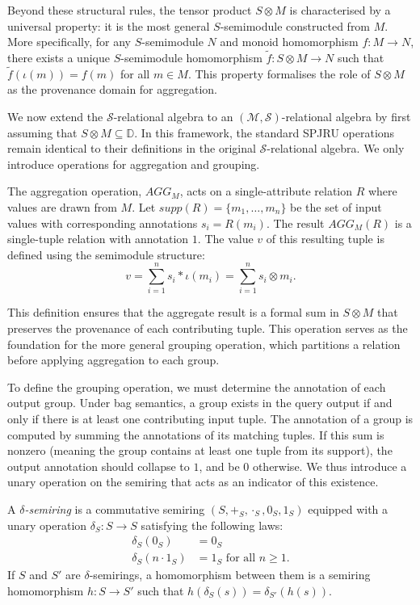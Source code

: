 \documentclass[oneside, 11pt]{amsbook}
\theoremstyle{plain}
\theoremstyle{definition}
\theoremstyle{remark}
\begin{document}
Beyond these structural rules, the tensor product $S \otimes M$ is characterised by a universal property: it is the most general $S$-semimodule constructed from $M$. More specifically, for any $S$-semimodule $N$ and monoid homomorphism $f: M \to N$, there exists a unique $S$-semimodule homomorphism $\tilde{f}: S \otimes M \to N$ such that $\tilde{f}(\iota(m)) = f(m)$ for all $m \in M$. This property formalises the role of $S \otimes M$ as the provenance domain for aggregation.

We now extend the $\mathcal{S}$-relational algebra to an $(\mathcal{M}, \mathcal{S})$-relational algebra by first assuming that $S \otimes M \subseteq \mathbb{D}$. In this framework, the standard SPJRU operations remain identical to their definitions in the original $\mathcal{S}$-relational algebra. We only introduce operations for aggregation and grouping.

\begin{defn}[Aggregation]
    The aggregation operation, $AGG_M$, acts on a single-attribute relation $R$ where values are drawn from $M$. Let $supp(R) = \{m_1, \dots, m_n\}$ be the set of input values with corresponding annotations $s_i = R(m_i)$. The result $AGG_M(R)$ is a single-tuple relation with annotation $1$. The value $v$ of this resulting tuple is defined using the semimodule structure:
    \[
        v = \sum_{i=1}^n s_i \ast \iota(m_i) = \sum_{i=1}^n s_i \otimes m_i.
    \]
\end{defn}

This definition ensures that the aggregate result is a formal sum in $S \otimes M$ that preserves the provenance of each contributing tuple. This operation serves as the foundation for the more general grouping operation, which partitions a relation before applying aggregation to each group.

To define the grouping operation, we must determine the annotation of each output group. Under bag semantics, a group exists in the query output if and only if there is at least one contributing input tuple. The annotation of a group is computed by summing the annotations of its matching tuples. If this sum is nonzero (meaning the group contains at least one tuple from its support), the output annotation should collapse to $1$, and be $0$ otherwise. We thus introduce a unary operation on the semiring that acts as an indicator of this existence.

\begin{defn}
    A \emph{$\delta$-semiring} is a commutative semiring $(S, +_S, \cdot_S, 0_S, 1_S)$ equipped with a unary operation $\delta_S : S \to S$ satisfying the following laws:
    \[
        \begin{aligned}
            \delta_S(0_S)         & = 0_S                           \\
            \delta_S(n \cdot 1_S) & = 1_S \text{ for all } n \ge 1.
        \end{aligned}
    \]
    If $S$ and $S'$ are $\delta$-semirings, a homomorphism between them is a semiring homomorphism $h: S \to S'$ such that $h(\delta_S(s)) = \delta_{S'}(h(s))$.
\end{defn}
\end{document}
